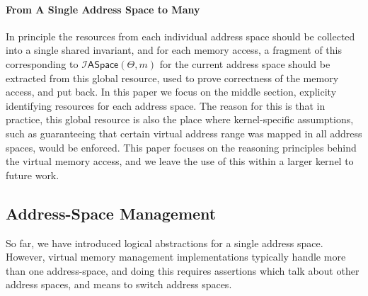 \paragraph{From A Single Address Space to Many}
In principle the resources from each individual address space should be collected into a single
shared invariant, and for each memory access,
a fragment of this corresponding to $\mathcal{I}\textsf{ASpace}(\Theta,m)$
for the current address space should be extracted from this global resource, used to prove correctness of the
memory access, and put back.
In this paper we focus on the middle section, explicity identifying resources for each
address space. The reason for this is that in practice, this global resource is also
the place where kernel-specific assumptions, such as guaranteeing that certain virtual address range
was mapped in all address spaces, would be enforced. This paper focuses on the
reasoning principles behind the virtual memory access, and we leave the use of this within a larger
kernel to future work.

\subsection{Address-Space Management}
\label{sec:aspacemanagement}
So far, we have introduced logical abstractions for a single address space. However, virtual memory management
implementations typically handle more than one address-space,
and doing this requires assertions which talk about other address spaces, and means to switch address spaces.



